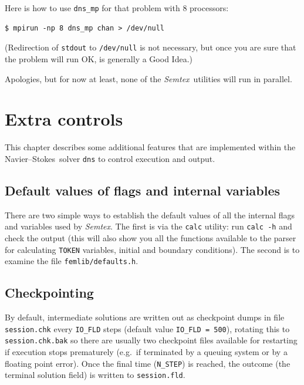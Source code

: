 \documentclass[11pt]{report}
\newcommand{\Semtex}{\emph{Semtex}} \newcommand{\Dog}{\emph{Dog}}
\newcommand{\eg}{e.g.\ } \newcommand{\CC}{\mathrm{c.c.}}
\newcommand\NavSto{Navier--Stokes}
\begin{document}
Here is how to use \verb|dns_mp| for that problem with 8 processors:
{\small
\begin{verbatim}
$ mpirun -np 8 dns_mp chan > /dev/null
\end{verbatim}}
\noindent
(Redirection of \verb|stdout| to \verb|/dev/null| is not necessary,
but once you are sure that the problem will run OK, is generally a
Good Idea.)

Apologies, but for now at least, none of the \Semtex\ utilities will
run in parallel.

\chapter{Extra controls}
\label{ch.extra}

This chapter describes some additional features that are implemented
within the \NavSto\ solver \verb+dns+ to control execution and
output.

\section{Default values of flags and internal variables}
\label{sec.default}

There are two simple ways to establish the default values of all the
internal flags and variables used by \Semtex. The first is via
the \verb+calc+ utility: run \verb+calc -h+ and check the output (this
will also show you all the functions available to the parser for
calculating \verb+TOKEN+ variables, initial and boundary
conditions). The second is to examine the file
\verb+femlib/defaults.h+.

\section{Checkpointing}
\label{sec.check}

By default, intermediate solutions are written out as checkpoint dumps
in file \verb+session.chk+ every \verb+IO_FLD+ steps (default value
\verb+IO_FLD = 500+), rotating this to \verb+session.chk.bak+ so there
are usually two checkpoint files available for restarting if execution
stops prematurely (\eg if terminated by a queuing system or by a
floating point error).  Once the final time (\verb+N_STEP+) is
reached, the outcome (the terminal solution field) is written to
\verb+session.fld+.
\end{document}
